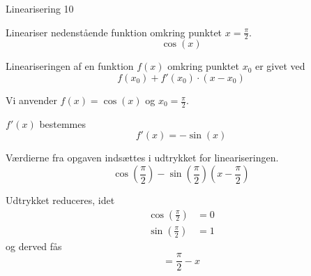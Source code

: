 \documentclass{article}
\begin{document}
\begin{exercise}{Linearisering 10}
	
	Lineariser nedenstående funktion omkring punktet $x = \frac{\pi}{2}$.
	\[
	\cos(x)
	\]
	
	
	\hint
	Lineariseringen af en funktion $f(x)$
	omkring punktet $x_0$ er givet ved
	\[
	f(x_0) + f'(x_0) \cdot (x - x_0)
	\]
	
	\hint
	Vi anvender $f(x) = \cos(x)$ og $x_0 = \frac{\pi}{2}$.
	
	\hint
	$f'(x)$ bestemmes
	\[
	f'(x) = - \sin(x)
	\]
	
	\hint
	Værdierne fra opgaven indsættes i udtrykket for lineariseringen.
	\[
	\cos \left(\frac{\pi}{2}\right) - \sin \left(\frac{\pi}{2} \right) \left(x - \frac{\pi}{2} \right) 
	\]
	
	\hint
	Udtrykket reduceres, idet
	\begin{align*}
	\cos\left(  \frac{\pi}{2}\right) &= 0  \\
	\sin\left(  \frac{\pi}{2}\right) &= 1 
	\end{align*}
	og derved fås
	\[
	= \frac{\pi}{2} - x
	\]
	
\end{exercise}
\end{document}
